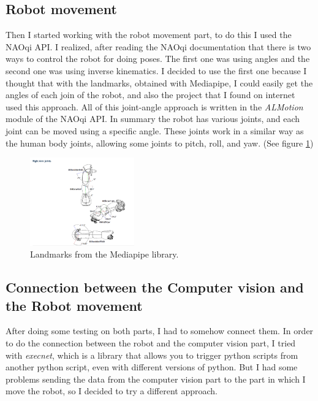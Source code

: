 \documentclass[conference]{IEEEtran}
\begin{document}
\subsection{Robot movement}

Then I started working with the robot movement part, to do this I used the NAOqi API. I realized, after reading the NAOqi documentation that there is two ways to control the robot for doing poses. The first one was using angles and the second one was using inverse kinematics. 
I decided to use the first one because I thought that with the landmarks, obtained with Mediapipe, I could easily get the angles of each join of the robot, and also the project that I found on internet used this approach.
All of this joint-angle approach is written in the \textit{ALMotion} module of the NAOqi API. 
In summary the robot has various joints, and each joint can be moved using a specific angle. These joints work in a similar way as the human body joints, allowing some joints to pitch, roll, and yaw. (See figure \ref{fig:RightArmAngles})

\begin{figure}[htbp]
    \centerline{\includegraphics[width=0.4\textwidth]{images/RightArmAngles.jpeg}}
    \caption{Landmarks from the Mediapipe library.}
    \label{fig:RightArmAngles}
    \end{figure}

\subsection{Connection between the Computer vision and the Robot movement}
After doing some testing on both parts, I had to somehow connect them. In order to do the connection between the robot and the computer vision part, I tried with \textit{execnet}, which is a library that allows you to trigger python scripts from another python script, even with different versions of python. But I had some problems sending the data from the computer vision part to the part in which I move the robot, so I decided to try a different approach.
\end{document}
